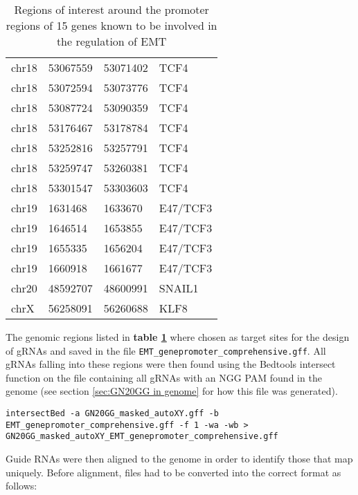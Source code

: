 \begin{table}[H]
\begin{center}
\begin{footnotesize}
\begin{tabular}{llll}
chr18 & 53067559 & 53071402	& TCF4 \\
chr18 & 53072594 & 53073776	& TCF4 \\
chr18 & 53087724 & 53090359	& TCF4 \\
chr18 & 53176467 & 53178784	& TCF4 \\
chr18 & 53252816 & 53257791	& TCF4 \\
chr18 & 53259747 & 53260381	& TCF4 \\
chr18 & 53301547 & 53303603	& TCF4 \\
chr19 & 1631468	 & 1633670	& E47/TCF3 \\
chr19 & 1646514	 & 1653855	& E47/TCF3 \\
chr19 & 1655335	 & 1656204	& E47/TCF3 \\
chr19 & 1660918	 & 1661677	& E47/TCF3  \\
chr20 & 48592707 & 48600991 & SNAIL1  \\
chrX & 56258091 & 56260688 &KLF8 \\
\hline
\end{tabular}
\caption{Regions of interest around the promoter regions of 15 genes known to be involved in the regulation of EMT \cite{DeCraene:2013kb}}
\label{tab:EMT5000-targets}
\end{footnotesize}
\end{center}
\end{table}


The genomic regions listed in \textbf{table \ref{tab:EMT5000-targets}} where chosen as target sites for the design of gRNAs  and saved in the file \verb|EMT_genepromoter_comprehensive.gff|. All gRNAs falling into these regions were then found using the Bedtools \cite{Quinlan:2010km} intersect function on the file containing all gRNAs with an NGG PAM found in the genome (see section \ref{sec:GN20GG in genome} for how this file was generated).

\begin{small}
\begin{lstlisting}
intersectBed -a GN20GG_masked_autoXY.gff -b EMT_genepromoter_comprehensive.gff -f 1 -wa -wb > GN20GG_masked_autoXY_EMT_genepromoter_comprehensive.gff
\end{lstlisting}\end{small}

Guide RNAs were then aligned to the genome in order to identify those that map uniquely. Before alignment, files had to be converted into the correct format as follows:

